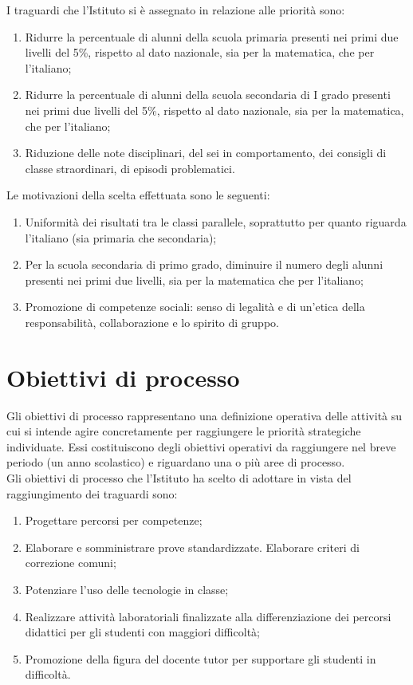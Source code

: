 \documentclass[12pt,a4paper,oneside]{memoir}
\begin{document}
I traguardi che l'Istituto si è assegnato in relazione alle priorità sono:
\begin{enumerate}
\item Ridurre la percentuale di alunni della scuola primaria presenti nei primi due livelli del 5\%, rispetto al dato nazionale, sia per la matematica, che per l'italiano;
\item Ridurre la percentuale di alunni della scuola secondaria di I grado presenti nei primi due livelli del 5\%, rispetto al dato nazionale, sia per la matematica, che per l'italiano;
\item Riduzione delle note disciplinari, del sei in comportamento, dei consigli di classe straordinari, di episodi problematici.
\end{enumerate}

Le motivazioni della scelta effettuata sono le seguenti:
\begin{enumerate}
\item Uniformità dei risultati tra le classi parallele, soprattutto per quanto riguarda l'italiano (sia primaria che secondaria);
\item Per la scuola secondaria di primo grado, diminuire il numero degli alunni presenti nei primi due livelli, sia per la matematica che per l'italiano;
\item Promozione di competenze sociali: senso di legalità e di un'etica della responsabilità, collaborazione e lo spirito di gruppo.
\end{enumerate}

\section{Obiettivi di processo}
Gli obiettivi di processo rappresentano una definizione operativa delle attività su cui si intende agire concretamente per raggiungere le priorità strategiche individuate. Essi costituiscono degli obiettivi operativi da raggiungere nel breve periodo (un anno scolastico) e riguardano una o più aree di processo.\\

Gli obiettivi di processo che l'Istituto ha scelto di adottare in vista del raggiungimento dei traguardi sono:
\begin{enumerate}
\item Progettare percorsi per competenze;
\item Elaborare e somministrare prove standardizzate. Elaborare criteri di correzione comuni;
\item Potenziare l'uso delle tecnologie in classe;
\item Realizzare attività laboratoriali finalizzate alla differenziazione dei percorsi didattici per gli studenti con maggiori difficoltà;
\item Promozione della figura del docente tutor per supportare gli studenti in difficoltà.
\end{enumerate}
\end{document}
